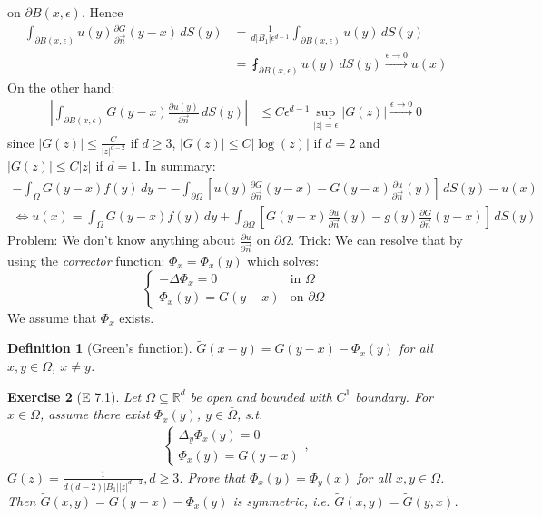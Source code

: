\documentclass{report}
\theoremstyle{tommy}
\newtheorem{defn}{Definition}
\newtheorem{ex}[defn]{Exercise}
\begin{document}
  on \(\partial B(x, \epsilon)\). Hence
  \begin{align*}
    \int_{\partial B(x, \epsilon)} u(y) \frac{\partial G}{\partial \vec{n}}(y-x) \, dS(y) 
    &= \frac{1}{d|B_1| \epsilon^{d-1}} \int_{\partial B(x, \epsilon)} u(y) \, dS(y) \\
    &= \fint_{\partial B(x,\epsilon)} u(y) \, dS(y)
    \xrightarrow{\epsilon \to 0} u(x) 
  \end{align*}
  On the other hand:
  \begin{align*}
    \left|\int_{\partial B(x, \epsilon)} G(y-x) \frac{\partial u(y)}{\partial \vec{n}} \, dS(y)\right|
    &\le C \epsilon^{d-1} \sup_{|z| = \epsilon} |G(z)| \xrightarrow{\epsilon \to 0} 0
  \end{align*}
  since \(|G(z)|\le \frac{C}{|z|^{d-2}}\) if \(d \ge 3\), \(|G(z)|\le C |\log(z)| \) if \(d = 2\) and \(|G(z)|\le C|z|\) if \(d = 1\). In summary: 
  \begin{align*}
    - \int_\Omega G(y-x) f(y) \, dy 
    = - \int_{\partial \Omega} \left[u(y) \frac{\partial G}{\partial \vec{n}} (y-x) - G(y-x) \frac{\partial u}{\partial \vec{n}}(y)\right] \, dS(y) - u(x) \\
    \Leftrightarrow u(x) = \int_\Omega G(y-x) f(y) \, dy + \int_{\partial \Omega} \left[G(y-x) \frac{\partial u}{\partial \vec{n}}(y) - g(y) \frac{\partial G}{\partial \vec{n}}(y-x)\right] \, dS(y)
  \end{align*}
  Problem: We don't know anything about \(\frac{\partial u}{\partial \vec{n}}\) on \(\partial \Omega\). Trick: We can resolve that by using the \emph{corrector} function: \(\Phi_x = \Phi_x(y)\) which solves:
  \[\begin{cases}
    - \Delta \Phi_x = 0 & \text{in } \Omega \\ \Phi_x(y) = G(y-x) &\text{on } \partial \Omega
  \end{cases}\]
  We assume that \(\Phi_x\) exists. 

  \begin{defn}[Green's function]
    \(\tilde G(x-y) = G(y-x) - \Phi_x(y)\) for all \(x,y \in \Omega\), \(x \ne y\).
  \end{defn}
  

  \begin{ex}[E 7.1]
    Let \(\Omega \subseteq \mathbb{R}^d\) be open and bounded with \(C^1\) boundary. For \(x \in \Omega\), assume there exist \(\Phi_x(y)\), \(y \in \bar \Omega\), s.t. 
    \begin{align*}
      \begin{cases}
        \Delta_y \Phi_x(y) = 0 \\ \Phi_x(y) = G(y-x)
      \end{cases},
    \end{align*}
    \(G(z) = \frac{1}{d(d-2)|B_1||z|^{d-2}}, d \ge 3\). Prove that \(\Phi_x(y) = \Phi_y(x)\) for all \(x,y \in \Omega\). Then \(\tilde G(x,y) = G(y-x) - \Phi_x(y)\) is symmetric, i.e. \(\tilde G(x,y) = \tilde G(y,x)\).
  \end{ex}
\end{document}
